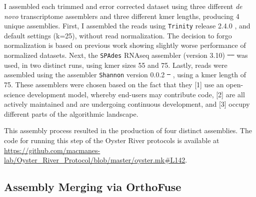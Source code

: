 \documentclass[10pt,letterpaper]{article}
\providecommand{\DIFaddtex}[1]{{\protect\color{blue}\uwave{#1}}} %
\providecommand{\DIFdeltex}[1]{{\protect\color{red}\sout{#1}}}                      %
\providecommand{\DIFaddbegin}{} %
\providecommand{\DIFaddend}{} %
\providecommand{\DIFdelbegin}{} %
\providecommand{\DIFdelend}{} %
\providecommand{\DIFadd}[1]{\texorpdfstring{\DIFaddtex{#1}}{#1}} %
\providecommand{\DIFdel}[1]{\texorpdfstring{\DIFdeltex{#1}}{}} %
\newcommand{\DIFscaledelfig}{0.5}
\newlength{\DIFdelgraphicswidth} %
\newlength{\DIFdelgraphicsheight} %
\newcommand{\DIFaddincludegraphics}[2][]{{\color{blue}\fbox{\DIFOincludegraphics[#1]{#2}}}} %
\newcommand{\DIFdelincludegraphics}[2][]{%
\sbox{\DIFdelgraphicsbox}{\DIFOincludegraphics[#1]{#2}}%
\settoboxwidth{\DIFdelgraphicswidth}{\DIFdelgraphicsbox} %
\settoboxtotalheight{\DIFdelgraphicsheight}{\DIFdelgraphicsbox} %
\scalebox{\DIFscaledelfig}{%
\parbox[b]{\DIFdelgraphicswidth}{\usebox{\DIFdelgraphicsbox}\\[-\baselineskip] \rule{\DIFdelgraphicswidth}{0em}}\llap{\resizebox{\DIFdelgraphicswidth}{\DIFdelgraphicsheight}{%
\setlength{\unitlength}{\DIFdelgraphicswidth}%
\begin{picture}(1,1)%
\thicklines\linethickness{2pt} %
{\color[rgb]{1,0,0}\put(0,0){\framebox(1,1){}}}%
{\color[rgb]{1,0,0}\put(0,0){\line( 1,1){1}}}%
{\color[rgb]{1,0,0}\put(0,1){\line(1,-1){1}}}%
\end{picture}%
}\hspace*{3pt}}} %
} %
\DeclareRobustCommand{\DIFaddbegin}{\DIFOaddbegin \let\includegraphics\DIFaddincludegraphics} %
\DeclareRobustCommand{\DIFaddend}{\DIFOaddend \let\includegraphics\DIFOincludegraphics} %
\DeclareRobustCommand{\DIFdelbegin}{\DIFOdelbegin \let\includegraphics\DIFdelincludegraphics} %
\DeclareRobustCommand{\DIFdelend}{\DIFOaddend \let\includegraphics\DIFOincludegraphics} %
\begin{document}
I assembled each trimmed and error corrected dataset using three different \textit{de novo} transcriptome assemblers and three different kmer lengths, producing 4 unique assemblies. First, I assembled the reads using \texttt{Trinity} release 2.4.0 \citep{Haas:2013jq}, and default settings (k=25), without read normalization. The decision to forgo normalization is based on previous work \citep{MacManes:2015iz} showing slightly worse performance of normalized datasets. Next, the \texttt{SPAdes} RNAseq assembler (version 3.10) \DIFdelbegin \DIFdel{\mbox{%
\cite{Chikhi:2013ep} }%
}\DIFdelend \DIFaddbegin \DIFadd{\mbox{%
\citep{Chikhi:2013ep} }%
}\DIFaddend was used, in two distinct runs, using kmer sizes 55 and 75. Lastly, reads were assembled using the assembler \texttt{Shannon} version 0.0.2 \DIFdelbegin \DIFdel{\mbox{%
\cite{Kannan:2016be}}%
}\DIFdelend \DIFaddbegin \DIFadd{\mbox{%
\citep{Kannan:2016be}}%
}\DIFaddend , using a kmer length of 75. These assemblers were chosen based on the fact that they [1] use an open-science development model, whereby end-users may contribute code, [2] are all actively maintained and are undergoing continuous development, and [3] occupy different parts of the algorithmic landscape. 

This assembly process resulted in the production of four distinct assemblies. The code for running this step of the Oyster River protocols is available at \url{https://github.com/macmanes-lab/Oyster_River_Protocol/blob/master/oyster.mk#L142}.  


\subsection{Assembly Merging via OrthoFuse}
\end{document}
